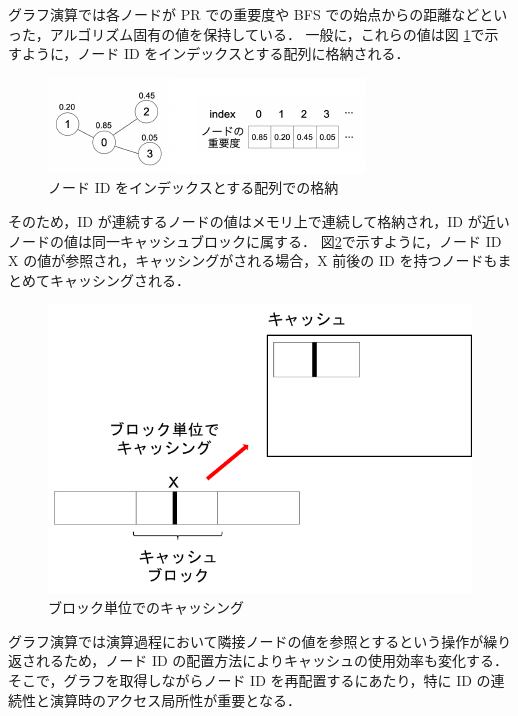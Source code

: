 グラフ演算では各ノードが PR での重要度や BFS での始点からの距離などといった，アルゴリズム固有の値を保持している．
一般に，これらの値は図 \ref{id_index}で示すように，ノード ID をインデックスとする配列に格納される．
\begin{figure}[t]
  \centering
  \includegraphics[width=\linewidth]{./figure/id_index.pdf}
  \caption{ノード ID をインデックスとする配列での格納}
  \label{id_index}
\end{figure}
そのため，ID が連続するノードの値はメモリ上で連続して格納され，ID が近いノードの値は同一キャッシュブロックに属する．
図\ref{cache_block}で示すように，ノード ID X の値が参照され，キャッシングがされる場合，X 前後の ID を持つノードもまとめてキャッシングされる．
\begin{figure}[t]
  \centering
  \includegraphics[scale=1.0]{./figure/cache_block.pdf}
  \caption{ブロック単位でのキャッシング}
  \label{cache_block}
\end{figure}
グラフ演算では演算過程において隣接ノードの値を参照とするという操作が繰り返されるため，ノード ID の配置方法によりキャッシュの使用効率も変化する．
そこで，グラフを取得しながらノード ID を再配置するにあたり，特に ID の連続性と演算時のアクセス局所性が重要となる．
